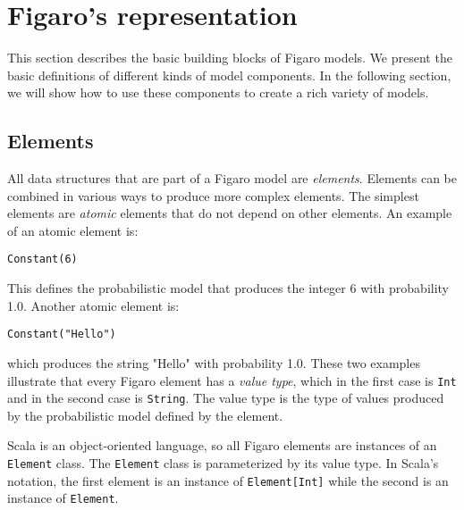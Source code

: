 
\chapter{Figaro's representation} %

\label{Figaro's representation} %

This section describes the basic building blocks of Figaro models. We present the basic definitions of different kinds of model components. In the following section, we will show how to use these components to create a rich variety of models.

\section{Elements}
All data structures that are part of a Figaro model are \emph{elements}. Elements can be combined in various ways to produce more complex elements. The simplest elements are \emph{atomic} elements that do not depend on other elements. An example of an atomic element is:

\begin{flushleft}
\texttt{Constant(6)}
\end{flushleft}

This defines the probabilistic model that produces the integer 6 with probability
1.0. Another atomic element is:
\begin{flushleft}
\texttt{Constant("Hello")}
\end{flushleft}

which produces the string "Hello" with probability 1.0. These two examples illustrate that every Figaro element has a \emph{value type}, which in the first case is \texttt{Int} and in the second case is \texttt{String}. The value type is the type of values produced by the probabilistic model defined by the element.


Scala is an object-oriented language, so all Figaro elements are instances of an \texttt{Element} class. The \texttt{Element} class is parameterized by its value type. In Scala's notation, the first element is an instance of \texttt{Element[Int]} while the second is an instance of \texttt{Element\-[String]}.

